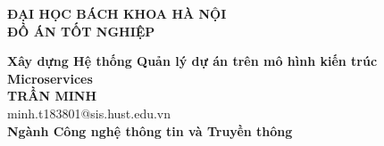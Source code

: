 \documentclass[DoAn.tex]{subfiles}
\begin{document}
\begin{titlepage}
  \thispagestyle{empty}
  \begin{center}

    {\textbf{\large{ĐẠI HỌC BÁCH KHOA HÀ NỘI}}}\\[4cm]

    {\textbf{\huge{ ĐỒ ÁN TỐT NGHIỆP}}}\\[1cm]
    {\textbf{\Large{Xây dựng Hệ thống Quản lý dự án trên mô hình kiến trúc Microservices}}\\[1cm]

    {\textbf{\large{TRẦN MINH}}}\\
    {\large{minh.t183801@sis.hust.edu.vn}}\\[0.5cm]

    {\textbf{\large{Ngành Công nghệ thông tin và Truyền thông}}}\\

    \vspace{2cm}
    \begin{table}[H]
      \centering
    \end{table}}
  \end{center}



\end{titlepage}
\end{document}

